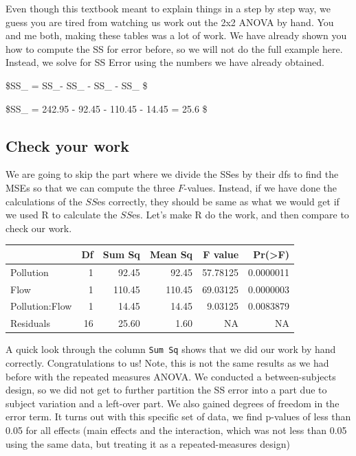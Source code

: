 \documentclass[
  letterpaper,
  DIV=11,
  numbers=noendperiod]{scrreprt}
\begin{document}
Even though this textbook meant to explain things in a step by step way,
we guess you are tired from watching us work out the 2x2 ANOVA by hand.
You and me both, making these tables was a lot of work. We have already
shown you how to compute the SS for error before, so we will not do the
full example here. Instead, we solve for SS Error using the numbers we
have already obtained.

\$SS\_ = SS\_- SS\_ -
SS\_ - SS\_ \$

\$SS\_ = 242.95 - 92.45 - 110.45 - 14.45 = 25.6 \$

\subsection{Check your work}\label{check-your-work}

We are going to skip the part where we divide the SSes by their dfs to
find the MSEs so that we can compute the three \(F\)-values. Instead, if
we have done the calculations of the \(SS\)es correctly, they should be
same as what we would get if we used R to calculate the \(SS\)es. Let's
make R do the work, and then compare to check our work.

\begin{tabular}{l|r|r|r|r|r}
\hline
  & Df & Sum Sq & Mean Sq & F value & Pr(>F)\\
\hline
Pollution & 1 & 92.45 & 92.45 & 57.78125 & 0.0000011\\
\hline
Flow & 1 & 110.45 & 110.45 & 69.03125 & 0.0000003\\
\hline
Pollution:Flow & 1 & 14.45 & 14.45 & 9.03125 & 0.0083879\\
\hline
Residuals & 16 & 25.60 & 1.60 & NA & NA\\
\hline
\end{tabular}

A quick look through the column \texttt{Sum\ Sq} shows that we did our
work by hand correctly. Congratulations to us! Note, this is not the
same results as we had before with the repeated measures ANOVA. We
conducted a between-subjects design, so we did not get to further
partition the SS error into a part due to subject variation and a
left-over part. We also gained degrees of freedom in the error term. It
turns out with this specific set of data, we find p-values of less than
0.05 for all effects (main effects and the interaction, which was not
less than 0.05 using the same data, but treating it as a
repeated-measures design)
\end{document}
